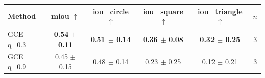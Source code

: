 \begin{tabular}{lccccc}
\toprule
Method & miou $\uparrow$ & iou\_circle $\uparrow$ & iou\_square $\uparrow$ & iou\_triangle $\uparrow$ & $n$ \\
\midrule
GCE q=0.3 & \textbf{0.54 $\pm$ 0.11} & \textbf{0.51 $\pm$ 0.14} & \textbf{0.36 $\pm$ 0.08} & \textbf{0.32 $\pm$ 0.25} & 3 \\
GCE q=0.9 & \underline{0.45 $\pm$ 0.15} & \underline{0.48 $\pm$ 0.14} & \underline{0.23 $\pm$ 0.25} & \underline{0.12 $\pm$ 0.21} & 3 \\
\bottomrule
\end{tabular}
